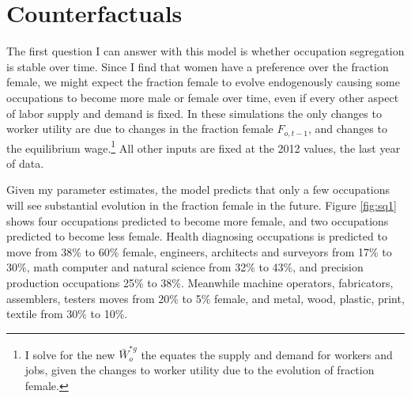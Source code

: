\documentclass[12pt]{article}
\begin{document}

%

%
%
%
%
%
%
%








\section{Counterfactuals}


The first question I can answer with this model is whether occupation segregation is stable over time. Since I find that women have a preference over the fraction female, we might expect the fraction female to evolve endogenously causing some occupations to become more male or female over time, even if every other aspect of labor supply and demand is fixed. In these simulations the only changes to worker utility are due to changes in the fraction female $F_{o,t-1}$, and changes to the equilibrium wage.\footnote{I solve for the new $ \bar{W}^{*g}_o$ the equates the supply and demand for workers and jobs, given the changes to worker utility due to the evolution of fraction female.}  All other inputs are fixed at the 2012 values, the last year of data.  

Given my parameter estimates, the model predicts that only a few occupations will see substantial evolution in the fraction female in the future. Figure \ref{fig:sq1} shows four occupations predicted to become more female, and two occupations predicted to become less female. Health diagnosing occupations  is predicted to move from 38\% to 60\% female, engineers, architects and surveyors from 17\% to 30\%, math computer and natural science from  32\% to 43\%, and precision production occupations 25\% to 38\%. Meanwhile machine operators, fabricators, assemblers, testers moves from 20\% to 5\% female, and metal, wood, plastic, print, textile from 30\% to 10\%.
\end{document}
